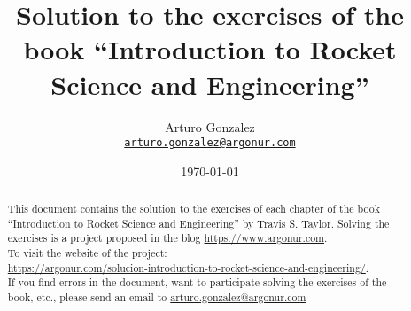 \documentclass{article}
\begin{document}
\title{Solution to the exercises of the book ``Introduction to Rocket Science and Engineering''}
\author{Arturo Gonzalez\\
	\texttt{\href{mailto:arturo.gonzalez@argonur.com}{arturo.gonzalez@argonur.com}}}
\date{\today}
\maketitle

\begin{abstract}
This document contains the solution to the exercises of each chapter of the book ``Introduction to Rocket Science and Engineering'' by Travis S. Taylor. Solving the exercises is a project proposed in the blog \url{https://www.argonur.com}.\\

To visit the website of the project: \\
\url{https://argonur.com/solucion-introduction-to-rocket-science-and-engineering/}.\\

If you find errors in the document, want to participate solving the exercises of the book, etc., please send an email to \href{mailto:arturo.gonzalez@argonur.com}{arturo.gonzalez@argonur.com}
\end{abstract}

\cleardoublepage



\cleardoublepage

\graphicspath{{Chapter2/}}


\cleardoublepage
\end{document}
